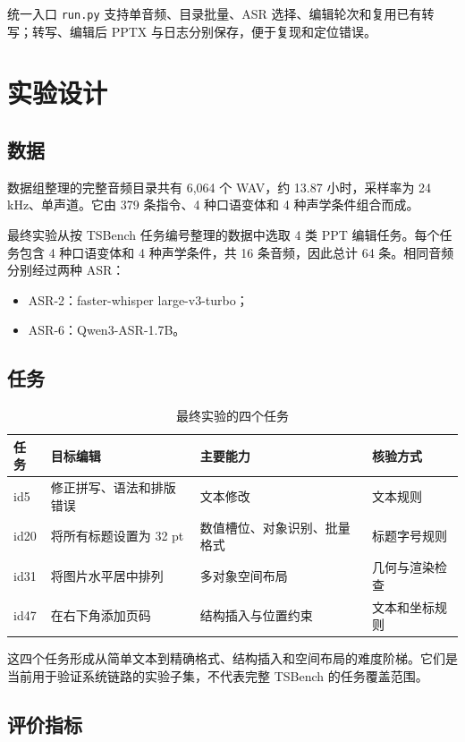 \documentclass[11pt,a4paper,UTF8,fontset=fandol]{ctexart}
\begin{document}
统一入口 \texttt{run.py} 支持单音频、目录批量、ASR 选择、编辑轮次和复用已有转写；转写、编辑后 PPTX 与日志分别保存，便于复现和定位错误。

\section{实验设计}

\subsection{数据}

数据组整理的完整音频目录共有 6,064 个 WAV，约 13.87 小时，采样率为 24 kHz、单声道。它由 379 条指令、4 种口语变体和 4 种声学条件组合而成。

最终实验从按 TSBench 任务编号整理的数据中选取 4 类 PPT 编辑任务。每个任务包含 4 种口语变体和 4 种声学条件，共 16 条音频，因此总计 64 条。相同音频分别经过两种 ASR：

\begin{itemize}
  \item ASR-2：faster-whisper large-v3-turbo；
  \item ASR-6：Qwen3-ASR-1.7B。
\end{itemize}

\subsection{任务}

\begin{table}[H]
\centering
\caption{最终实验的四个任务}
\small
\begin{tabularx}{\textwidth}{C{1.2cm} L{5.2cm} Y L{3.1cm}}
\toprule
任务 & 目标编辑 & 主要能力 & 核验方式 \\
\midrule
id5 & 修正拼写、语法和排版错误 & 文本修改 & 文本规则 \\
id20 & 将所有标题设置为 32 pt & 数值槽位、对象识别、批量格式 & 标题字号规则 \\
id31 & 将图片水平居中排列 & 多对象空间布局 & 几何与渲染检查 \\
id47 & 在右下角添加页码 & 结构插入与位置约束 & 文本和坐标规则 \\
\bottomrule
\end{tabularx}
\end{table}

这四个任务形成从简单文本到精确格式、结构插入和空间布局的难度阶梯。它们是当前用于验证系统链路的实验子集，不代表完整 TSBench 的任务覆盖范围。

\subsection{评价指标}
\end{document}
